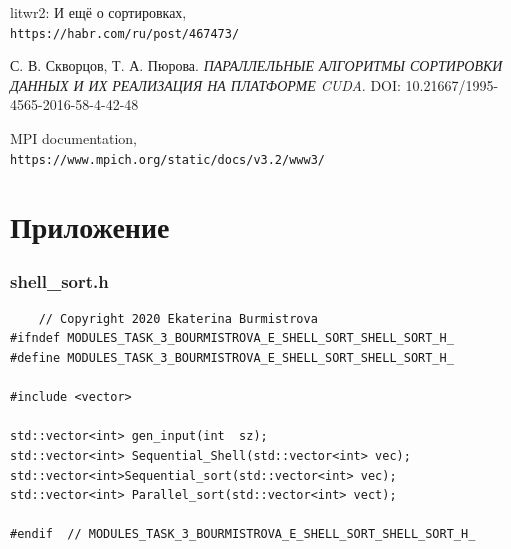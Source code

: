 \documentclass[12pt, letterpaper]{report}
\begin{document}
\begin{thebibliography}{9}
litwr2: И ещё о сортировках,
\\\texttt{https://habr.com/ru/post/467473/}


С. В. Скворцов, Т. А. Пюрова. 
\textit{ПАРАЛЛЕЛЬНЫЕ АЛГОРИТМЫ СОРТИРОВКИ ДАННЫХ
И ИХ РЕАЛИЗАЦИЯ НА ПЛАТФОРМЕ CUDA}.
DOI: 10.21667/1995-4565-2016-58-4-42-48

MPI documentation,
\\\texttt{https://www.mpich.org/static/docs/v3.2/www3/}
\end{thebibliography}

\chapter*{Приложение}
 	\subsection*{shell\_sort.h}
 	\begin{verbatim}
 	// Copyright 2020 Ekaterina Burmistrova
#ifndef MODULES_TASK_3_BOURMISTROVA_E_SHELL_SORT_SHELL_SORT_H_
#define MODULES_TASK_3_BOURMISTROVA_E_SHELL_SORT_SHELL_SORT_H_

#include <vector>

std::vector<int> gen_input(int  sz);
std::vector<int> Sequential_Shell(std::vector<int> vec);
std::vector<int>Sequential_sort(std::vector<int> vec);
std::vector<int> Parallel_sort(std::vector<int> vect);

#endif  // MODULES_TASK_3_BOURMISTROVA_E_SHELL_SORT_SHELL_SORT_H_
 	\end{verbatim}
\end{document}
